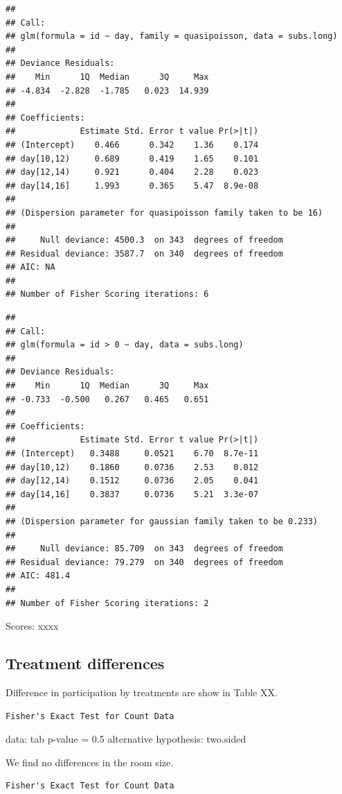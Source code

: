 \documentclass[12pt,]{article}
\theoremstyle{plain} %
\begin{document}
\begin{verbatim}
## 
## Call:
## glm(formula = id ~ day, family = quasipoisson, data = subs.long)
## 
## Deviance Residuals: 
##    Min      1Q  Median      3Q     Max  
## -4.834  -2.828  -1.785   0.023  14.939  
## 
## Coefficients:
##             Estimate Std. Error t value Pr(>|t|)
## (Intercept)    0.466      0.342    1.36    0.174
## day[10,12)     0.689      0.419    1.65    0.101
## day[12,14)     0.921      0.404    2.28    0.023
## day[14,16]     1.993      0.365    5.47  8.9e-08
## 
## (Dispersion parameter for quasipoisson family taken to be 16)
## 
##     Null deviance: 4500.3  on 343  degrees of freedom
## Residual deviance: 3587.7  on 340  degrees of freedom
## AIC: NA
## 
## Number of Fisher Scoring iterations: 6
\end{verbatim}

\begin{verbatim}
## 
## Call:
## glm(formula = id > 0 ~ day, data = subs.long)
## 
## Deviance Residuals: 
##    Min      1Q  Median      3Q     Max  
## -0.733  -0.500   0.267   0.465   0.651  
## 
## Coefficients:
##             Estimate Std. Error t value Pr(>|t|)
## (Intercept)   0.3488     0.0521    6.70  8.7e-11
## day[10,12)    0.1860     0.0736    2.53    0.012
## day[12,14)    0.1512     0.0736    2.05    0.041
## day[14,16]    0.3837     0.0736    5.21  3.3e-07
## 
## (Dispersion parameter for gaussian family taken to be 0.233)
## 
##     Null deviance: 85.709  on 343  degrees of freedom
## Residual deviance: 79.279  on 340  degrees of freedom
## AIC: 481.4
## 
## Number of Fisher Scoring iterations: 2
\end{verbatim}

Scores: xxxx

\subsection{Treatment differences}\label{treatment-differences}

Difference in participation by treatments are show in Table XX.

\begin{verbatim}
Fisher's Exact Test for Count Data
\end{verbatim}

data: tab p-value = 0.5 alternative hypothesis: two.sided

We find no differences in the room size.

\begin{verbatim}
Fisher's Exact Test for Count Data
\end{verbatim}
\end{document}
